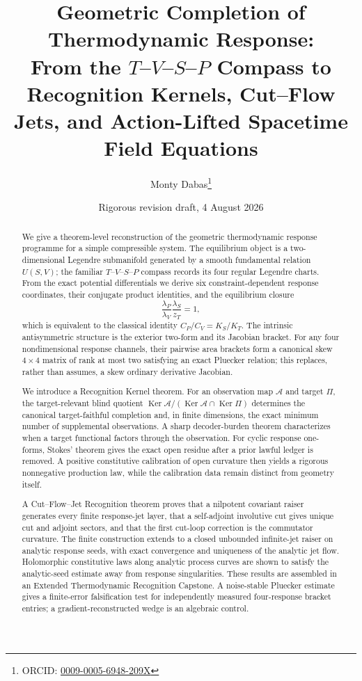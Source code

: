 \documentclass[11pt]{article}
\title{Geometric Completion of Thermodynamic Response:\\
From the \texorpdfstring{$T$--$V$--$S$--$P$}{T-V-S-P} Compass to Recognition Kernels, Cut--Flow Jets, and Action-Lifted Spacetime Field Equations}
\author{Monty Dabas\thanks{ORCID: \href{https://orcid.org/0009-0005-6948-209X}{0009-0005-6948-209X}}}
\date{Rigorous revision draft, 4 August 2026}
\newcommand{\Ker}{\operatorname{Ker}}
\newcommand{\cA}{\mathcal A}
\begin{document}
\maketitle

\begin{abstract}
We give a theorem-level reconstruction of the geometric thermodynamic response programme for a simple compressible system.  The equilibrium object is a two-dimensional Legendre submanifold generated by a smooth fundamental relation $U(S,V)$; the familiar $T$--$V$--$S$--$P$ compass records its four regular Legendre charts.  From the exact potential differentials we derive six constraint-dependent response coordinates, their conjugate product identities, and the equilibrium closure
\[
\frac{\lambda_P}{\lambda_V}\frac{\lambda_S}{z_T}=1,
\]
which is equivalent to the classical identity $C_P/C_V=K_S/K_T$.  The intrinsic antisymmetric structure is the exterior two-form and its Jacobian bracket.  For any four nondimensional response channels, their pairwise area brackets form a canonical skew $4\times4$ matrix of rank at most two satisfying an exact Pluecker relation; this replaces, rather than assumes, a skew ordinary derivative Jacobian.

We introduce a Recognition Kernel theorem.  For an observation map $\cA$ and target $\Pi$, the target-relevant blind quotient $\Ker\cA/(\Ker\cA\cap\Ker\Pi)$ determines the canonical target-faithful completion and, in finite dimensions, the exact minimum number of supplemental observations.  A sharp decoder-burden theorem characterizes when a target functional factors through the observation.  For cyclic response one-forms, Stokes' theorem gives the exact open residue after a prior lawful ledger is removed.  A positive constitutive calibration of open curvature then yields a rigorous nonnegative production law, while the calibration data remain distinct from geometry itself.

A Cut--Flow--Jet Recognition theorem proves that a nilpotent covariant raiser generates every finite response-jet layer, that a self-adjoint involutive cut gives unique cut and adjoint sectors, and that the first cut-loop correction is the commutator curvature.  The finite construction extends to a closed unbounded infinite-jet raiser on analytic response seeds, with exact convergence and uniqueness of the analytic jet flow.  Holomorphic constitutive laws along analytic process curves are shown to satisfy the analytic-seed estimate away from response singularities.  These results are assembled in an Extended Thermodynamic Recognition Capstone.  A noise-stable Pluecker estimate gives a finite-error falsification test for independently measured four-response bracket entries; a gradient-reconstructed wedge is an algebraic control.


\end{abstract}
\end{document}

